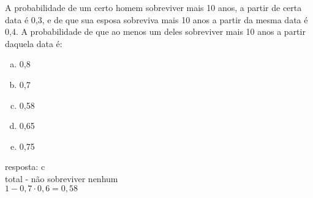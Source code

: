 \begin{ex}
	A probabilidade de um certo homem sobreviver mais 10 anos, a partir de certa data é 0,3, e de que sua esposa sobreviva mais 10 anos a partir da mesma data é 0,4. A probabilidade de que ao menos um deles sobreviver mais 10 anos a partir daquela data é:
    \begin{enumerate}[(a)]
    \item 0,8
    \item 0,7
    \item 0,58
    \item 0,65
    \item 0,75
    \end{enumerate}
      \begin{sol}
        resposta: c \\
        total - não sobreviver nenhum \\
        $1-0,7\cdot0,6=0,58$
     \end{sol}
\end{ex}